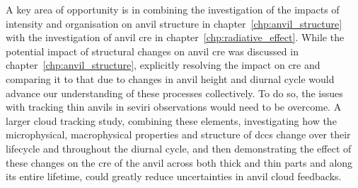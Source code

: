 A key area of opportunity is in combining the investigation of the impacts of intensity and organisation on anvil structure in chapter~\ref{chp:anvil_structure} with the investigation of anvil \acrshort{cre} in chapter~\ref{chp:radiative_effect}.
While the potential impact of structural changes on anvil \acrshort{cre} was discussed in chapter~\ref{chp:anvil_structure}, explicitly resolving the impact on \acrshort{cre} and comparing it to that due to changes in anvil height and diurnal cycle would advance our understanding of these processes collectively.
To do so, the issues with tracking thin anvils in \acrshort{seviri} observations would need to be overcome.
A larger cloud tracking study, combining these elements, investigating how the microphysical, macrophysical properties and structure of \acrshort{dcc}s change over their lifecycle and throughout the diurnal cycle, and then demonstrating the effect of these changes on the \acrshort{cre} of the anvil across both thick and thin parts and along its entire lifetime, could greatly reduce uncertainties in anvil cloud feedbacks.





